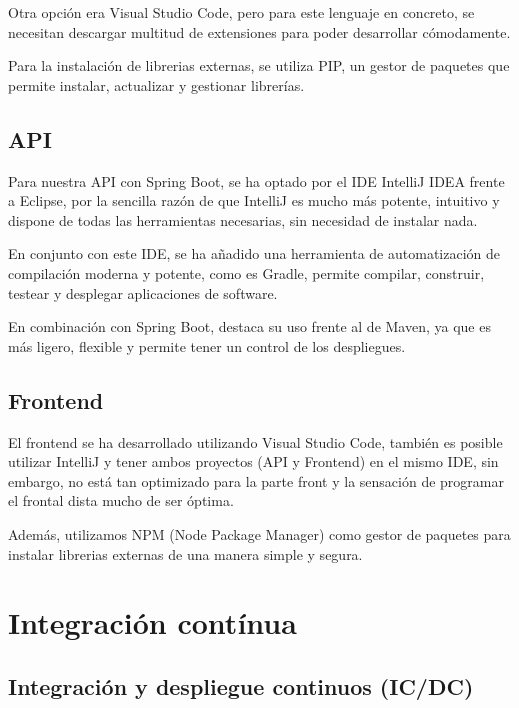 Otra opción era Visual Studio Code, pero para este lenguaje en concreto, se necesitan descargar multitud de extensiones
para poder desarrollar cómodamente.

Para la instalación de librerias externas, se utiliza PIP\cite{pip:official}, un gestor de paquetes que permite
instalar, actualizar y gestionar librerías.

\subsection{API}\label{subsec:desarrollo_api}

Para nuestra API con Spring Boot, se ha optado por el IDE IntelliJ IDEA\cite{intellij:official} frente a Eclipse,
por la sencilla razón de que IntelliJ es mucho más potente, intuitivo y dispone de todas las herramientas necesarias,
sin necesidad de instalar nada.

En conjunto con este IDE, se ha añadido una herramienta de automatización de compilación moderna y potente, como es
Gradle\cite{gradle:official}, permite compilar, construir, testear y desplegar aplicaciones de software.

En combinación con Spring Boot, destaca su uso frente al de Maven, ya que es más ligero, flexible y permite tener un control de
los despliegues.

\subsection{Frontend}\label{subsec:desarrollo_frontend}

El frontend se ha desarrollado utilizando Visual Studio Code\cite{vscode:official}, también es posible utilizar IntelliJ y tener ambos
proyectos (API y Frontend) en el mismo IDE, sin embargo, no está tan optimizado para la parte front y la sensación de
programar el frontal dista mucho de ser óptima.

Además, utilizamos NPM (Node Package Manager)\cite{npm:official} como gestor de paquetes para instalar librerias
externas de una manera simple y segura.

\section{Integración contínua}\label{sec:integracion}

\subsection{Integración y despliegue continuos (IC/DC)}\label{subsec:integracion_continua}

